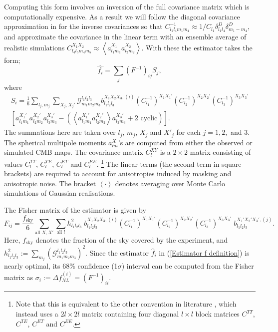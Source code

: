 Computing this form involves an inversion of the full covariance matrix which is computationally expensive. As a result we will follow the diagonal covariance approximation in \cite{Yadav2007} for the inverse covariances so that {$C_{l_1 l_4 m_1 m_4}^{-1} \approx 1/C_{l_1}  \delta^D_{l_1 l_4} \delta^D_{m_1 -m_4}$}, and approximate the covariance in the linear term with an ensemble average of realistic simulations  {$C_{l_4 l_5 m_4 m_5}^{X_1 X_2} \approx \left< a_{l_1 m_1}^{X_1} a_{l_2 m_2}^{X_2} \right>$}.  With these the estimator takes the form;
\begin{equation}
	\hat{f_i} = \sum_j (F^{-1})_{ij} S_j,
	\label{Estimator f definition}
\end{equation}
where
\begin{eqnarray}
	S_i =  \frac{1}{6} \sum_{l_j, m_j} \sum_{X_j, X_j'} \mathcal{G}_{m_1 m_2 m_3}^{l_1 l_2 l_3} b_{l_1 l_2 l_3} ^{X_1 X_2 X_3, (i)} (C_{l_1}^{-1})^{X_1 X_1'} (C_{l_2}^{-1})^{X_2 X_2'} (C_{l_3}^{-1})^{X_3 X_3'} \nonumber \\  \left[ a_{l_1 m_1}^{X_1'} a_{l_2 m_2}^{X_2'} a_{l_3 m_3}^{X_3'} -  \left( \left< a_{l_1 m_1}^{X_1'} a_{l_2 m_2}^{X_2'} \right> a_{l_3 m_3}^{X_3'} + \text{2 cyclic} \right)   \right].
	\label{Estimator S definition}
\end{eqnarray}
The summations here are taken over $l_j$, $m_j$, $X_j$ and $X'_j$ for each $j=1,2,$ and $3$. The spherical multipole moments $a_{lm}^{X}$'s are computed from either the observed or simulated CMB maps. The covariance matrix $C_l^{XY}$ is a $2\times2$ matrix consisting of values $C_l^{TT}$, $C_l^{TE}$, $C_l^{ET}$ and $C_l^{EE}$. \footnote{Note that this is equivalent to the other convention in literature \cite{Fergusson2014}, which instead uses a $2l\times2l$ matrix containing four diagonal $l\times l$ block matrices $C^{TT}$, $C^{TE}$, $C^{ET}$ and $C^{EE}$.} The linear terms (the second term in square brackets) are required to account for anisotropies induced by masking and anisotropic noise. The bracket $\left< \cdot \right>$ denotes averaging over Monte Carlo simulations of Gaussian realisations.

The Fisher matrix of the estimator is given by
\begin{equation}
	F_{ij}= \frac{f_\text{sky}}{6} \sum_{\text{all }X, X'} \sum_{\text{all }l} h_{l_1 l_2 l_3}^2 \; b_{l_1 l_2 l_3}^{X_1 X_2 X_3, (i)} (C_{l_1}^{-1})^{X_1 X_1'} (C_{l_2}^{-1})^{X_2 X_2'} (C_{l_3}^{-1})^{X_3 X_3'} \; b_{l_1 l_2 l_3}^{X_1' X_2' X_3', (j)}.
	\label{Estimator F definition}
\end{equation}
Here, $f_\text{sky}$ denotes the fraction of the sky covered by the experiment, and $h_{l_1 l_2 l_3}^2 := \sum_{m_j} \left( \mathcal{G}_{m_1 m_2 m_3}^{l_1 l_2 l_3} \right) ^2$. Since the estimator $\hat{f}_i$ in (\ref{Estimator f definition}) is nearly optimal, its 68\% confidence (1$\sigma$) interval can be computed from the Fisher matrix as $\sigma_i := \Delta f_{NL}^{(i)} = (F^{-1})_{ii}$.

